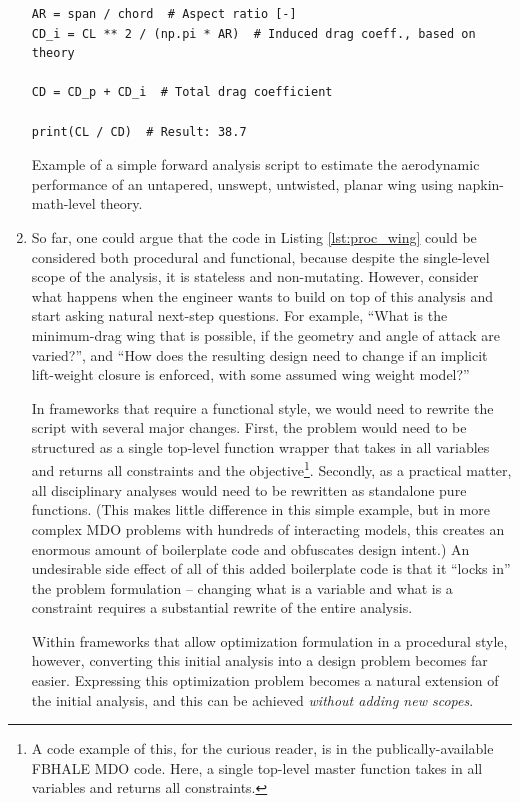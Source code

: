 \begin{enumerate}
\begin{listing}[H]
\begin{verbatim}
AR = span / chord  # Aspect ratio [-]
CD_i = CL ** 2 / (np.pi * AR)  # Induced drag coeff., based on theory

CD = CD_p + CD_i  # Total drag coefficient

print(CL / CD)  # Result: 38.7
        \end{verbatim}
        \caption{Example of a simple forward analysis script to estimate the aerodynamic performance of an untapered, unswept, untwisted, planar wing using napkin-math-level theory.}
        \label{lst:proc_wing}
    \end{listing}

    \item So far, one could argue that the code in Listing \ref{lst:proc_wing} could be considered both procedural and functional, because despite the single-level scope of the analysis, it is stateless and non-mutating. However, consider what happens when the engineer wants to build on top of this analysis and start asking natural next-step questions. For example, ``What is the minimum-drag wing that is possible, if the geometry and angle of attack are varied?'', and ``How does the resulting design need to change if an implicit lift-weight closure is enforced, with some assumed wing weight model?''

    In frameworks that require a functional style, we would need to rewrite the script with several major changes. First, the problem would need to be structured as a single top-level function wrapper that takes in all variables and returns all constraints and the objective\footnote{A code example of this, for the curious reader, is in the publically-available FBHALE MDO code. Here, a single top-level master function takes in all variables and returns all constraints.}. Secondly, as a practical matter, all disciplinary analyses would need to be rewritten as standalone pure functions. (This makes little difference in this simple example, but in more complex MDO problems with hundreds of interacting models, this creates an enormous amount of boilerplate code and obfuscates design intent.) An undesirable side effect of all of this added boilerplate code is that it ``locks in'' the problem formulation -- changing what is a variable and what is a constraint requires a substantial rewrite of the entire analysis.

    Within frameworks that allow optimization formulation in a procedural style, however, converting this initial analysis into a design problem becomes far easier. Expressing this optimization problem becomes a natural extension of the initial analysis, and this can be achieved \emph{without adding new scopes}.


\end{enumerate}
